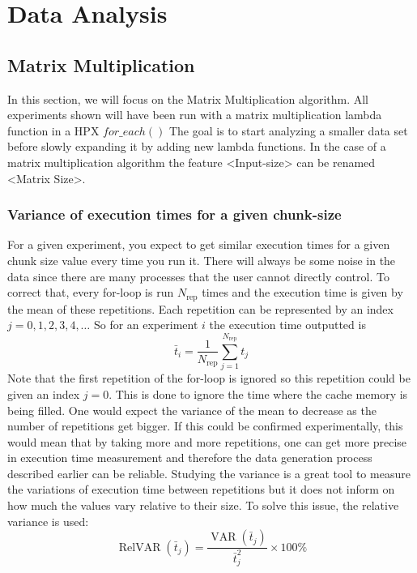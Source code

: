 \section{Data Analysis}

\subsection{Matrix Multiplication}
In this section, we will focus on the Matrix Multiplication algorithm. All experiments shown will have been run with a matrix multiplication lambda function in a HPX $for\_each()$ The goal is to start analyzing a smaller data set before slowly expanding it by adding new lambda functions. In the case of a matrix multiplication algorithm the feature <Input-size> can be renamed <Matrix Size>.

\subsubsection{Variance of execution times for a given chunk-size}
For a given experiment, you expect to get similar execution times for a given chunk size value every time you run it. There will always be some noise in the data since there are many processes that the user cannot directly control. To correct that, every for-loop is run $N_\text{rep}$ times and the execution time is given by the mean of these repetitions. Each repetition can be represented by an index $j=0,1,2,3,4, \dots$ So for an experiment $i$ the execution time outputted is 
$$\bar{t}_i=\frac{1}{N_\text{rep}}\sum_{j=1}^{N_\text{rep}}t_j$$
Note that the first repetition of the for-loop is ignored so this repetition could be given an index $j=0$. This is done to ignore the time where the cache memory is being filled.
One would expect the variance of the mean
to decrease as the number of repetitions get bigger. If this could be confirmed experimentally, this would mean that by taking more and more repetitions, one can get more precise in execution time measurement and therefore the data generation process described earlier can be reliable. Studying the variance is a great tool to measure the variations of execution time between repetitions but it does not inform on how much the values vary relative to their size. To solve this issue, the relative variance is used:
$$\operatorname{RelVAR}(\bar{t}_j)=\frac{\operatorname{VAR}(\bar{t}_j)}{\bar{t}_j^2}\times 100 \%$$

